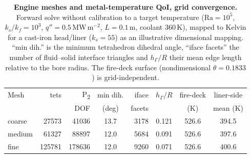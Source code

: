 \begin{table}[ht]\centering
\caption{\textbf{Engine meshes and metal-temperature QoI, grid convergence.} Forward solve
without calibration to a target temperature ($\mathrm{Ra}=10^{5}$, $k_s/k_f=10^{3}$, $q''=0.5\,$MW\,m$^{-2}$, $L=0.1\,$m,
coolant $360\,$K), mapped to Kelvin for a cast-iron head/liner ($k_s=55$) as an illustrative
dimensional mapping. ``min dih.'' is the minimum tetrahedron dihedral angle, ``iface facets''
the number of fluid--solid interface triangles and $h_{\Gamma}/R$ their mean edge length
relative to the bore radius. The fire-deck surface (nondimensional $\theta=0.1833$) is
grid-independent.}
\label{tab:engine-mesh}\label{tab:engine-qoi}
\footnotesize\setlength{\tabcolsep}{5pt}
\begin{tabular}{l r r S r S S S}
\toprule
{Mesh} & {tets} & {P\textsubscript{2}} & {min dih.} & {iface}
  & {$h_{\Gamma}/R$} & {fire-deck} & {liner-side} \\
       & {}      & {DOF}                & {(deg)}    & {facets}
  & {}               & {(K)}         & {mean (K)} \\
\midrule
coarse & 27573  & 41036  & 13.7 & 3178 & 0.121 & 526.6 & 394.5 \\
medium & 61327  & 88897  & 12.0 & 5684 & 0.091 & 526.6 & 397.6 \\
fine   & 125781 & 178636 & 12.0 & 9260 & 0.071 & 526.6 & 400.6 \\
\bottomrule
\end{tabular}
\end{table}
